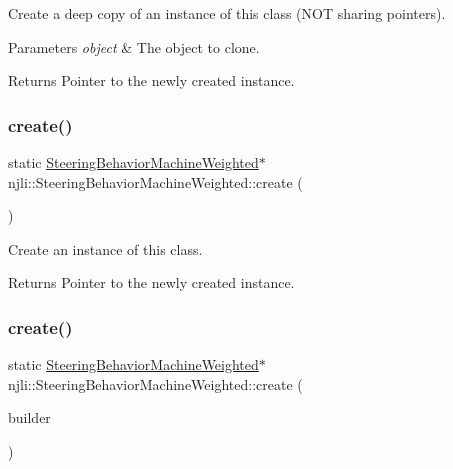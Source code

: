 Create a deep copy of an instance of this class (N\+OT sharing pointers).


\begin{DoxyParams}{Parameters}
{\em object} & The object to clone.\\
\hline
\end{DoxyParams}
\begin{DoxyReturn}{Returns}
Pointer to the newly created instance. 
\end{DoxyReturn}
\mbox{\label{classnjli_1_1_steering_behavior_machine_weighted_a5f1fa8d36411ff094b1444fdac9d39b5}} 
\subsubsection{\texorpdfstring{create()}{create()}\hspace{0.1cm}{\footnotesize\ttfamily [1/2]}}
{\footnotesize\ttfamily static \mbox{\hyperlink{classnjli_1_1_steering_behavior_machine_weighted}{Steering\+Behavior\+Machine\+Weighted}}$\ast$ njli\+::\+Steering\+Behavior\+Machine\+Weighted\+::create (\begin{DoxyParamCaption}{ }\end{DoxyParamCaption})\hspace{0.3cm}{\ttfamily [static]}}

Create an instance of this class.

\begin{DoxyReturn}{Returns}
Pointer to the newly created instance. 
\end{DoxyReturn}
\mbox{\label{classnjli_1_1_steering_behavior_machine_weighted_a631f5e5e58812c839466527b768a3d6a}} 
\subsubsection{\texorpdfstring{create()}{create()}\hspace{0.1cm}{\footnotesize\ttfamily [2/2]}}
{\footnotesize\ttfamily static \mbox{\hyperlink{classnjli_1_1_steering_behavior_machine_weighted}{Steering\+Behavior\+Machine\+Weighted}}$\ast$ njli\+::\+Steering\+Behavior\+Machine\+Weighted\+::create (\begin{DoxyParamCaption}\item[{const \mbox{\hyperlink{classnjli_1_1_steering_behavior_machine_weighted_builder}{Steering\+Behavior\+Machine\+Weighted\+Builder}} \&}]{builder }\end{DoxyParamCaption})\hspace{0.3cm}{\ttfamily [static]}}

